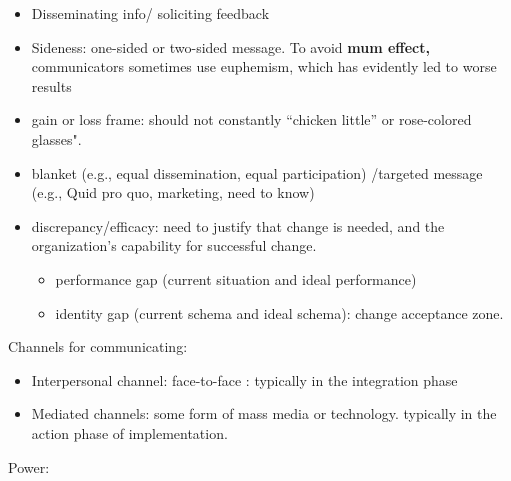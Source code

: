 \documentclass[
]{book}
\providecommand{\tightlist}{%
  \setlength{\itemsep}{0pt}\setlength{\parskip}{0pt}}
\begin{document}
\begin{itemize}
\item
  Disseminating info/ soliciting feedback
\item
  Sideness: one-sided or two-sided message. To avoid \textbf{mum effect,} communicators sometimes use euphemism, which has
  evidently led to worse results
\item
  gain or loss frame: should not constantly ``chicken little'' or rose-colored glasses".
\item
  blanket (e.g., equal dissemination, equal participation) /targeted message (e.g., Quid pro quo, marketing, need to
  know)
\item
  discrepancy/efficacy: need to justify that change is needed, and the organization's capability for successful
  change.

  \begin{itemize}
  \item
    performance gap (current situation and ideal performance)
  \item
    identity gap (current schema and ideal schema): change acceptance zone.
  \end{itemize}
\end{itemize}

Channels for communicating:

\begin{itemize}
\tightlist
\item
  Interpersonal channel: face-to-face : typically in the integration phase
\item
  Mediated channels: some form of mass media or technology. typically in the action phase of implementation.
\end{itemize}

Power:
\end{document}
